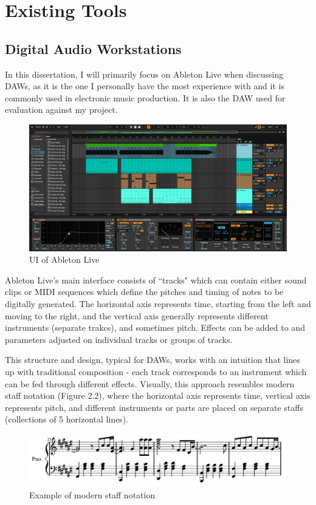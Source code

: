 \documentclass[12pt,a4paper,twoside,openright]{report}
\begin{document}
\section{Existing Tools}
\subsection{Digital Audio Workstations}
In this dissertation, I will primarily focus on Ableton Live when discussing DAWs, as it is the one I personally have the most experience with and it is commonly used in electronic music production. It is also the DAW used for evaluation against my project.

\begin{figure}[h]
    \centering
    \includegraphics[scale=0.3]{images/ableton example.png}
    \caption{UI of Ableton Live}
    \label{fig:ableton}
\end{figure}

Ableton Live's main interface consists of ``tracks" which can contain either sound clips or MIDI sequences which define the pitches and timing of notes to be digitally generated. The horizontal axis represents time, starting from the left and moving to the right, and the vertical axis generally represents different instruments (separate trakcs), and sometimes pitch. Effects can be added to and parameters adjusted on individual tracks or groups of tracks. 

This structure and design, typical for DAWs, works with an intuition that lines up with traditional composition - each track corresponds to an instrument which can be fed through different effects. Visually, this approach resembles modern staff notation (Figure 2.2), where the horizontal axis represents time, vertical axis represents pitch, and different instruments or parts are placed on separate staffs (collections of 5 horizontal lines).

\begin{figure}[h]
    \centering
    \includegraphics[scale=0.7]{images/modern staff notation.png}
    \caption{Example of modern staff notation}
    \label{fig:my_label}
\end{figure}
\end{document}
